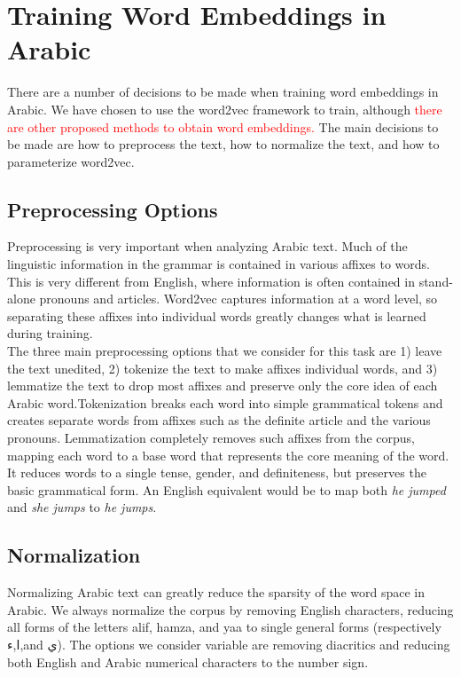 \section{Training Word Embeddings in Arabic}

There are a number of decisions to be made when training word embeddings in Arabic. We have chosen to use the word2vec framework to train, although \textcolor{red}{there are other proposed methods to obtain word embeddings.} The main decisions to be made are how to preprocess the text, how to normalize the text, and how to parameterize word2vec.

\subsection{Preprocessing Options}

Preprocessing is very important when analyzing Arabic text. Much of the linguistic information in the grammar is contained in various affixes to words. This is very different from English, where information is often contained in stand-alone pronouns and articles. Word2vec captures information at a word level, so separating these affixes into individual words greatly changes what is learned during training.
\\
The three main preprocessing options that we consider for this task are 1) leave the text unedited, 2) tokenize the text to make affixes individual words, and 3) lemmatize the text to drop most affixes and preserve only the core idea of each Arabic word.Tokenization breaks each word into simple grammatical tokens and creates separate words from affixes such as the definite article and the various pronouns. Lemmatization completely removes such affixes from the corpus, mapping each word to a base word that represents the core meaning of the word. It reduces words to a single tense, gender, and definiteness, but preserves the basic grammatical form. An English equivalent would be to map both \textit{he jumped} and \textit{she jumps} to \textit{he jumps}.

\subsection{Normalization}

Normalizing Arabic text can greatly reduce the sparsity of the word space in Arabic. We always normalize the corpus by removing English characters, reducing all forms of the letters alif, hamza, and yaa to single general forms (respectively ا,ء,and ي). The options we consider variable are removing diacritics and reducing both English and Arabic numerical characters to the number sign.

